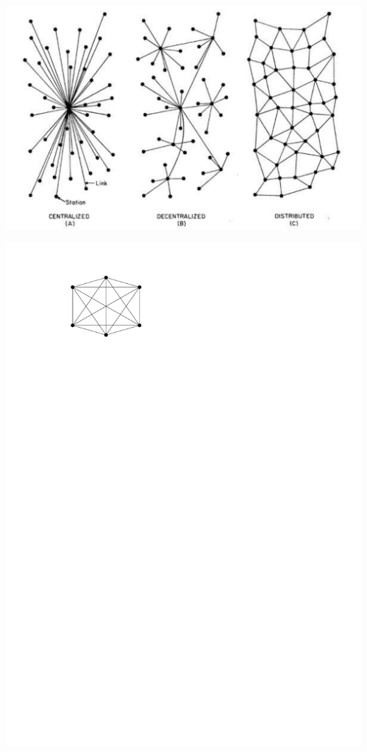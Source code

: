 \documentclass[usenames,dvipsnames,9pt]{beamer}
\begin{document}
\begin{frame}
\begin{center}
\includegraphics[width=.9\linewidth]{figs/ds.jpeg}
\end{center}
\end{frame}

\begin{frame}
\begin{center}
  \includegraphics[width=0.4\linewidth]{figs/complete.pdf}
\end{center}
\end{frame}
\end{document}
